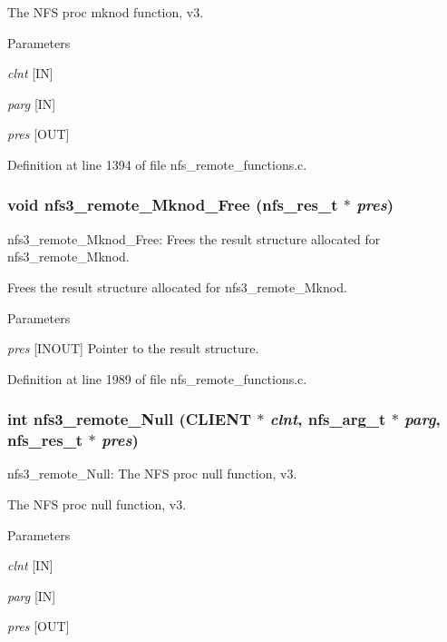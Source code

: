 The NFS proc mknod function, v3.


\begin{DoxyParams}{Parameters}
\item[{\em clnt}][IN] \item[{\em parg}][IN] \item[{\em pres}][OUT] \end{DoxyParams}


Definition at line 1394 of file nfs\_\-remote\_\-functions.c.
\subsubsection[{nfs3\_\-remote\_\-Mknod\_\-Free}]{\setlength{\rightskip}{0pt plus 5cm}void nfs3\_\-remote\_\-Mknod\_\-Free (nfs\_\-res\_\-t $\ast$ {\em pres})}\label{group__NFSprocs_gac9750449bc4e535e495d041292d150ad}
nfs3\_\-remote\_\-Mknod\_\-Free: Frees the result structure allocated for nfs3\_\-remote\_\-Mknod.

Frees the result structure allocated for nfs3\_\-remote\_\-Mknod.


\begin{DoxyParams}{Parameters}
\item[{\em pres}][INOUT] Pointer to the result structure. \end{DoxyParams}


Definition at line 1989 of file nfs\_\-remote\_\-functions.c.
\subsubsection[{nfs3\_\-remote\_\-Null}]{\setlength{\rightskip}{0pt plus 5cm}int nfs3\_\-remote\_\-Null (CLIENT $\ast$ {\em clnt}, \/  nfs\_\-arg\_\-t $\ast$ {\em parg}, \/  nfs\_\-res\_\-t $\ast$ {\em pres})}\label{group__NFSprocs_ga01c9b0d1d8af14aa4f856053dbf524b6}
nfs3\_\-remote\_\-Null: The NFS proc null function, v3.

The NFS proc null function, v3.


\begin{DoxyParams}{Parameters}
\item[{\em clnt}][IN] \item[{\em parg}][IN] \item[{\em pres}][OUT] \end{DoxyParams}


